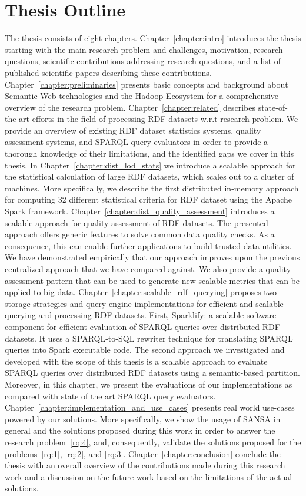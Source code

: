 \section{Thesis Outline}
\label{sec:thesis-outline}
The thesis consists of eight chapters.
Chapter~\ref{chapter:intro} introduces the thesis starting with the main research problem and challenges, motivation, research questions, scientific contributions addressing research questions, and a list of published scientific papers describing these contributions.
Chapter~\ref{chapter:preliminaries} presents basic concepts and background about Semantic Web technologies and the Hadoop Ecosystem for a comprehensive overview of the research problem. 
Chapter~\ref{chapter:related} describes state-of-the-art efforts in the field of processing \gls{RDF} datasets w.r.t research problem.
We provide an overview of existing RDF dataset statistics systems, quality assessment systems, and \gls{SPARQL} query evaluators in order to provide a thorough knowledge of their limitations, and the identified gaps we cover in this thesis.
In Chapter~\ref{chapter:dist_lod_stats} we introduce a scalable approach for the statistical calculation of large \gls{RDF} datasets, which scales out to a cluster of machines.
More specifically, we describe the first distributed in-memory approach for computing 32 different statistical criteria for \gls{RDF} dataset using the Apache Spark framework.
Chapter~\ref{chapter:dist_quality_assessment} introduces a scalable approach for quality assessment of \gls{RDF} datasets.
The presented approach offers generic features to solve common data quality checks.
As a consequence, this can enable further applications to build trusted data utilities.
We have demonstrated empirically that our approach improves upon the previous centralized approach that we have compared against.
We also provide a quality assessment pattern that can be used to generate new scalable metrics that can be applied to big data.
Chapter~\ref{chapter:scalable_rdf_querying} proposes two storage strategies and query engine implementations for efficient and scalable querying and processing \gls{RDF} datasets.
First, Sparklify: a scalable software component for efficient evaluation of \gls{SPARQL} queries over distributed \gls{RDF} datasets. 
It uses a SPARQL-to-SQL rewriter technique for translating \gls{SPARQL} queries into Spark executable code.
The second approach we investigated and developed with the scope of this thesis is a scalable approach to evaluate \gls{SPARQL} queries over distributed \gls{RDF} datasets using a semantic-based partition.
Moreover, in this chapter, we present the evaluations of our implementations as compared with state of the art \gls{SPARQL} query evaluators.
Chapter~\ref{chapter:implementation_and_use_cases} presents real world use-cases powered by our solutions. 
More specifically, we show the usage of SANSA in general and the solutions proposed during this work in order to answer the research problem~\ref{rq:4}, and, consequently, validate the solutions proposed for the problems~\ref{rq:1}, \ref{rq:2}, and \ref{rq:3}.
Chapter~\ref{chapter:conclusion} conclude the thesis with an overall overview of the contributions made during this research work and a discussion on the future work based on the limitations of the actual solutions. 

